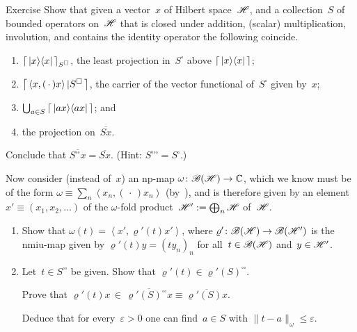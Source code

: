 \documentclass[a]{subfiles}
\begin{document}
\begin{parsec}
\begin{point}{Exercise}%
Show that given a vector~$x$ of Hilbert space~$\mathscr{H}$,
and a collection~$S$ of bounded operators on~$\mathscr{H}$
that is closed under addition, (scalar) multiplication,
involution, and contains the identity operator
the following coincide.
\begin{enumerate}
\item
$\left\lceil\,\left|x\right>\!\left<x\right|\,\right\rceil_{S^\square}$,
the least projection in~$S^\square$
above $\left\lceil\,\left|x\right>\!\left<x\right|\,\right\rceil$;
\item
$\left\lceil\,\left<x,(\,\cdot\,)x\right>|S^\square\,\right\rceil$,
the carrier of the vector functional of~$S^\square$
given by~$x$;
\item
$\bigcup_{a\in S} \left\lceil\,\left|ax\right>\!\left<ax\right|\,\right\rceil$; and 
\item
the projection on~$\overline{S x}$.
\end{enumerate}
Conclude that $\overline{S^{\square\square}x}
=\overline{S x}$.
(Hint: $S^{\square\square\square}=S^\square$.)
\begin{point}%
Now consider
(instead of~$x$)
an np-map $\omega\colon \mathscr{B}(\mathscr{H})\to \mathbb{C}$,
which we know must be of the form
$\omega\equiv \sum_n \left<x_n,(\,\cdot\,)x_n\right>$
(by~\TODO{}),
and is therefore given by 
an element $x'\equiv (x_1,x_2,\dotsc)$ of the $\omega$-fold
product~$\mathscr{H}':=\bigoplus_n\mathscr{H}$ of~$\mathscr{H}$.
\begin{enumerate}
\item
Show that  $\omega(t)=\left<x',\varrho'(t)x'\right>$,
where $\varrho'\colon \mathscr{B}(\mathscr{H})\to\mathscr{B}(\mathscr{H}')$
is the nmiu-map given by 
$\varrho'(t)y=(ty_n)_n$
for all~$t\in\mathscr{B}(\mathscr{H})$ and~$y\in\mathscr{H}'$.

\item
Let~$t\in S^{\square\square}$ be given.
Show that $\varrho'(t)\in \varrho'(S)^{\square\square}$.

Prove that  $\varrho'(t)x\,\in\,\overline{\varrho'(S)^{\square\square}x}
\equiv \overline{\varrho'(S)x}$.

Deduce
that for every~$\varepsilon>0$
one can find~$a\in S$ with $\|t-a\|_\omega \leq \varepsilon$.


\end{enumerate}
\end{point}
\end{point}
\end{parsec}
\end{document}
